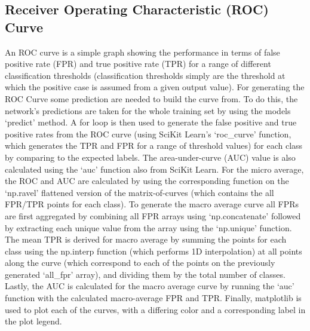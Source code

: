 \documentclass[12pt,letterpaper,oneside,reqno]{book}
\theoremstyle{plain}
\theoremstyle{definition}
\theoremstyle{plain}
\theoremstyle{remark}
\theoremstyle{plain}
\theoremstyle{definition}
\theoremstyle{plain}
\begin{document}
\subsection{Receiver Operating Characteristic (ROC) Curve} \label{ROC}
An ROC curve is a simple graph showing the performance in terms of false positive rate (FPR) and true positive rate (TPR) for a range of different classification thresholds (classification thresholds simply are the threshold at which the positive case is assumed from a given output value). For generating the ROC Curve some prediction are needed to build the curve from. To do this, the network's predictions are taken for the whole training set by using the models `predict' method. A for loop is then used to generate the false positive and true positive rates from the ROC curve (using SciKit Learn's `roc\_curve' function, which generates the TPR and FPR for a range of threshold values) for each class by comparing to the expected labels. The area-under-curve (AUC) value is also calculated using the `auc' function also from SciKit Learn. 
For the micro average, the ROC and AUC are calculated by using the corresponding function on the `np.ravel' flattened version of the matrix-of-curves (which contains the all FPR/TPR points for each class).
To generate the macro average curve all FPRs are first aggregated by combining all FPR arrays using `np.concatenate' followed by extracting each unique value from the array using the `np.unique' function. The mean TPR is derived for macro average by summing the points for each class using the np.interp function (which performs 1D interpolation) at all points along the curve (which correspond to each of the points on the previously generated `all\_fpr' array), and dividing them by the total number of classes. Lastly, the AUC is calculated for the macro average curve by running the `auc' function with the calculated macro-average FPR and TPR. Finally, matplotlib is used to plot each of the curves, with a differing color and a corresponding label in the plot legend.
\end{document}
